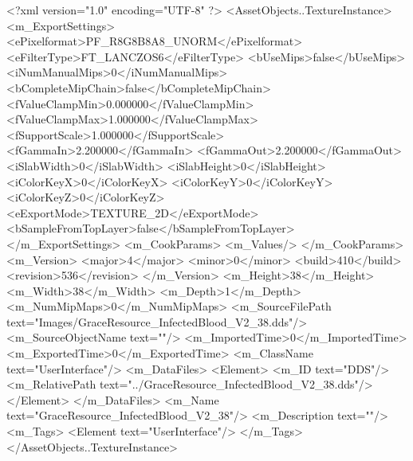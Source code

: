 <?xml version="1.0" encoding="UTF-8" ?>
<AssetObjects..TextureInstance>
	<m_ExportSettings>
		<ePixelformat>PF_R8G8B8A8_UNORM</ePixelformat>
		<eFilterType>FT_LANCZOS6</eFilterType>
		<bUseMips>false</bUseMips>
		<iNumManualMips>0</iNumManualMips>
		<bCompleteMipChain>false</bCompleteMipChain>
		<fValueClampMin>0.000000</fValueClampMin>
		<fValueClampMax>1.000000</fValueClampMax>
		<fSupportScale>1.000000</fSupportScale>
		<fGammaIn>2.200000</fGammaIn>
		<fGammaOut>2.200000</fGammaOut>
		<iSlabWidth>0</iSlabWidth>
		<iSlabHeight>0</iSlabHeight>
		<iColorKeyX>0</iColorKeyX>
		<iColorKeyY>0</iColorKeyY>
		<iColorKeyZ>0</iColorKeyZ>
		<eExportMode>TEXTURE_2D</eExportMode>
		<bSampleFromTopLayer>false</bSampleFromTopLayer>
	</m_ExportSettings>
	<m_CookParams>
		<m_Values/>
	</m_CookParams>
	<m_Version>
		<major>4</major>
		<minor>0</minor>
		<build>410</build>
		<revision>536</revision>
	</m_Version>
	<m_Height>38</m_Height>
	<m_Width>38</m_Width>
	<m_Depth>1</m_Depth>
	<m_NumMipMaps>0</m_NumMipMaps>
	<m_SourceFilePath text="Images/GraceResource_InfectedBlood_V2_38.dds"/>
	<m_SourceObjectName text=""/>
	<m_ImportedTime>0</m_ImportedTime>
	<m_ExportedTime>0</m_ExportedTime>
	<m_ClassName text="UserInterface"/>
	<m_DataFiles>
		<Element>
			<m_ID text="DDS"/>
			<m_RelativePath text="../GraceResource_InfectedBlood_V2_38.dds"/>
		</Element>
	</m_DataFiles>
	<m_Name text="GraceResource_InfectedBlood_V2_38"/>
	<m_Description text=""/>
	<m_Tags>
		<Element text="UserInterface"/>
	</m_Tags>
</AssetObjects..TextureInstance>
